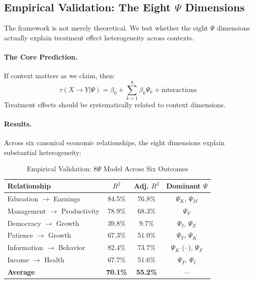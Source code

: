 \subsection{Empirical Validation: The Eight $\Psi$ Dimensions}
\label{sec:intro-validation}

The framework is not merely theoretical. We test whether the eight $\Psi$ dimensions actually explain treatment effect heterogeneity across contexts.

\paragraph{The Core Prediction.}
If context matters as we claim, then:
\begin{equation}
    \tau(X \rightarrow Y | \Psi) = \beta_0 + \sum_{k=1}^{8} \beta_k \Psi_k + \text{interactions}
\end{equation}
Treatment effects should be systematically related to context dimensions.

\paragraph{Results.}
Across six canonical economic relationships, the eight dimensions explain substantial heterogeneity:

\begin{table}[htbp]
\centering
\caption{Empirical Validation: 8$\Psi$ Model Across Six Outcomes}
\label{tab:validation-intro}
\small
\begin{tabular}{@{}lccc@{}}
\toprule
\textbf{Relationship} & \textbf{$R^2$} & \textbf{Adj. $R^2$} & \textbf{Dominant $\Psi$} \\
\midrule
Education $\rightarrow$ Earnings & 84.5\% & 76.8\% & $\Psi_K$, $\Psi_M$ \\
Management $\rightarrow$ Productivity & 78.9\% & 68.3\% & $\Psi_F$ \\
Democracy $\rightarrow$ Growth & 39.8\% & 9.7\% & $\Psi_I$, $\Psi_E$ \\
Patience $\rightarrow$ Growth & 67.3\% & 51.0\% & $\Psi_T$, $\Psi_K$ \\
Information $\rightarrow$ Behavior & 82.4\% & 73.7\% & $\Psi_K$ (--), $\Psi_F$ \\
Income $\rightarrow$ Health & 67.7\% & 51.6\% & $\Psi_T$, $\Psi_I$ \\
\midrule
\textbf{Average} & \textbf{70.1\%} & \textbf{55.2\%} & --- \\
\bottomrule
\end{tabular}
\end{table}

